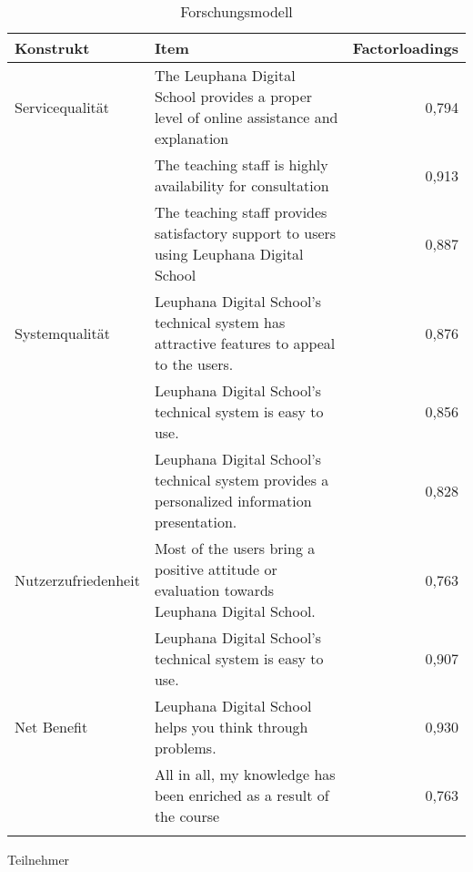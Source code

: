 \begin{table}[ht] 
\footnotesize
\caption{Forschungsmodell}
\label{tab:Forschungsmodell} 
\begin{tabular}{@{}lp{10cm}r@{}} \toprule

\textbf{Konstrukt} & \textbf{Item} & \textbf{Factorloadings} \\ \midrule

Servicequalität & The Leuphana Digital School provides a proper level of online assistance and explanation & 0,794\\ 

& The teaching staff is highly availability for consultation & 0,913 \\

& The teaching staff provides satisfactory support to users using Leuphana Digital School & 0,887 \\ 

Systemqualität & Leuphana Digital School’s technical system has attractive features to appeal to the users. & 0,876\\ 

& Leuphana Digital School’s technical system is easy to use. & 0,856 \\

& Leuphana Digital School’s technical system provides a personalized information presentation. & 0,828 \\ 

Nutzerzufriedenheit & Most of the users bring a positive attitude or evaluation towards Leuphana Digital School. & 0,763\\ 

& Leuphana Digital School’s technical system is easy to use. & 0,907 \\ 

Net Benefit & Leuphana Digital School helps you think through problems.  & 0,930\\ 

& All in all, my knowledge has been enriched as a result of the course & 0,763 \\ \addlinespace 
  \bottomrule

\end{tabular}	
\end{table}


Teilnehmer
   
